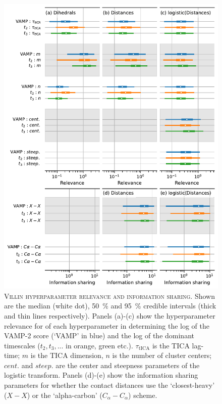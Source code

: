 \documentclass{article}
\begin{document}
\begin{figure}
    \centering
    \includegraphics[height=0.8\textheight]{figures/sensitivities/2f4k_sensitivity.pdf}
    \caption{\textsc{Villin hyperparameter relevance and information sharing}. Shown are the  median (white dot), \SI{50}{\percent} and \SI{95}{\percent} credible intervals (thick and thin lines respectively).  Panels (a)-(c) show the hyperparameter relevance for of each hyperparameter in determining the log of the VAMP-2 score (`VAMP' in blue) and the log of the dominant timescales ($t_{2}, t_{3}, ...$ in orange, green etc.). $\tau_{\mathrm{tICA}}$ is the TICA lag-time; $m$ is the TICA dimension, $n$ is the number of cluster centers; $cent.$ and $steep.$ are the center and steepness parameters of the logistic transform. Panels (d)-(e) show the information sharing parameters for whether the contact distances use the `closest-heavy' ($X-X$) or the `alpha-carbon' ($C_{\alpha}-C_{\alpha}$) scheme.  }
    \label{fig:2f4k_sense}
\end{figure}
\end{document}
